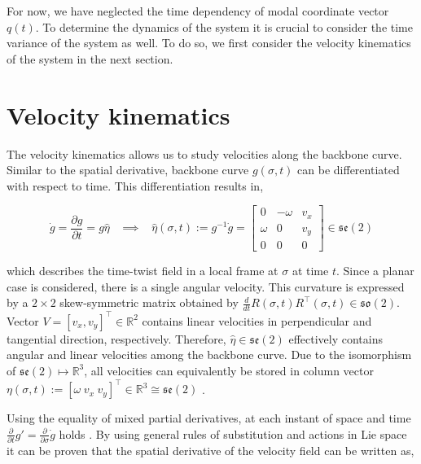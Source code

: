 For now, we have neglected the time dependency of modal coordinate vector $q(t)$. To determine the dynamics of the system it is crucial to consider the time variance of the system as well. To do so, we first consider the velocity kinematics of the system in the next section.


\section{Velocity kinematics}

The velocity kinematics allows us to study velocities along the backbone curve. Similar to the spatial derivative, backbone curve $g(\sigma,t)$ can be differentiated with respect to time. This differentiation results in, 

\begin{equation}
  \Dot{g} = \frac{\partial g}{\partial t} = g \hat{\eta} \hspace{10pt} \implies \hspace{10pt}  \hat{\eta}(\sigma,t) := g^{-1}\dot{g} = \begin{bmatrix} 0 & -\omega & v_x \\ \omega & 0 & v_y \\
  0& 0 & 0 \end{bmatrix} \in  \mathfrak{se}(2)
    \label{eq2:dgdt}
\end{equation}

which describes the time-twist field in a local frame at $\sigma$ at time $t$. Since a planar case is considered, there is a single angular velocity. This curvature is expressed by a $2 \times 2$ skew-symmetric matrix obtained by $\frac{d}{dt}R(\sigma,t)R^\top(\sigma,t) \in \mathfrak{so}(2)$. Vector $V = [v_x,v_y]^\top \in \mathbb{R}^2$ contains linear velocities in perpendicular and tangential direction, respectively. Therefore, $\hat{\eta} \in \mathfrak{se}(2)$ effectively contains angular and linear velocities among the backbone curve. Due to the isomorphism of $\mathfrak{se}(2) \longmapsto \mathbb{R}^3$, all velocities can equivalently be stored in column vector $\eta(\sigma,t) := [\omega \hspace{3pt} v_x \hspace{3pt} v_y]^\top \in \mathbb{R}^3 \cong \mathfrak{se}(2)$ \cite{Sola2018}.


Using the equality of mixed partial derivatives, at each instant of space and time $\frac{\partial}{\partial t}g' = \frac{\partial}{\partial \sigma}\dot{g}$ holds \cite{Caasenbrood2020}. By using general rules of substitution and actions in Lie space it can be proven that the spatial derivative of the velocity field can be written as,

